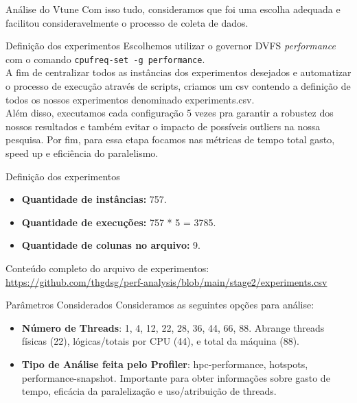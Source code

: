 \documentclass{beamer}
\begin{document}
\begin{frame}{Análise do Vtune}
    Com isso tudo, consideramos que foi uma escolha adequada e facilitou consideravelmente o processo de coleta de dados.
\end{frame}

\begin{frame}{Definição dos experimentos}
    Escolhemos utilizar o governor DVFS \textit{performance} com o comando \texttt{cpufreq-set -g performance}. \\
    \vspace{0.5em}
    A fim de centralizar todos as instâncias dos experimentos desejados e automatizar o processo de execução através de scripts, criamos um csv contendo a definição de todos os nossos experimentos denominado experiments.csv.\\
    \vspace{0.5em}
    Além disso, executamos cada configuração 5 vezes pra garantir a robustez dos nossos resultados e também evitar o impacto de possíveis outliers na nossa pesquisa.
    Por fim, para essa etapa focamos nas métricas de tempo total gasto, speed up e eficiência do paralelismo.
\end{frame}
\begin{frame}{Definição dos experimentos}
    \begin{itemize}
        \item \textbf{Quantidade de instâncias:} 757.
        \item \textbf{Quantidade de execuções:} 757 * 5 = 3785.
         \item \textbf{Quantidade de colunas no arquivo:} 9.
    \end{itemize}
    \vspace{0.5em}
    Conteúdo completo do arquivo de experimentos: \\ \url{https://github.com/thgdsg/perf-analysis/blob/main/stage2/experiments.csv}
\end{frame}

\begin{frame}{Parâmetros Considerados}
    Consideramos as seguintes opções para análise:
    \begin{itemize}
        \item \textbf{Número de Threads}: {1, 4, 12, 22, 28, 36, 44, 66, 88}.
        Abrange threads físicas (22), lógicas/totais por CPU (44), e total da máquina (88).
        \item \textbf{Tipo de Análise feita pelo Profiler}: {hpc-performance, hotspots, performance-snapshot}.
        Importante para obter informações sobre gasto de tempo, eficácia da paralelização e uso/atribuição de threads.
    \end{itemize}
\end{frame}
\end{document}
